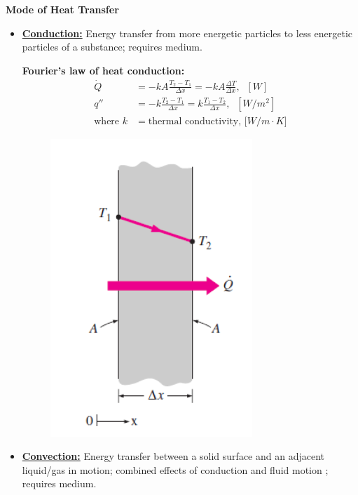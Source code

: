 \textbf{\large Mode of Heat Transfer}
\begin{itemize}
    \item \underline{\textbf{Conduction:}} Energy transfer from \color{red} more energetic \color{black} particles to \color{red} less energetic \color{black} particles of a substance; requires medium.
    
    \textbf{Fourier's law of heat conduction:}
    \begin{align*}
       \dot{Q} &= -kA\frac{T_2-T_1}{\Delta x} = -kA \frac{\Delta T}{\Delta x}, \; \; [W] \\
        q'' &= -k\frac{T_2-T_1}{\Delta x} = k \frac{T_1-T_2}{\Delta x}, \; \; [W/m^2]\\
        \text{where } k &= \text{thermal conductivity, [$W/m\cdot K$]}
    \end{align*}
    \begin{figure}[h]
        \centering
        \includegraphics[width=0.5\linewidth]{images/conduction.png}
    \end{figure}
    \item \underline{\textbf{Convection:}} Energy transfer between a solid surface and an adjacent liquid/gas in motion; combined effects of \color{red} conduction \color{black} and \color{red} fluid motion \color{black}; requires medium.
    

\end{itemize}
